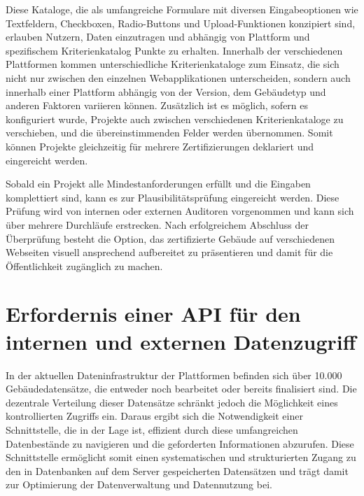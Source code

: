\documentclass[draft,final]{vutinfth} %
\begin{document}
Diese Kataloge, die als umfangreiche Formulare mit diversen Eingabeoptionen wie Textfeldern, Checkboxen, Radio-Buttons und Upload-Funktionen konzipiert sind, erlauben Nutzern, Daten einzutragen und abhängig von Plattform und spezifischem Kriterienkatalog Punkte zu erhalten.
Innerhalb der verschiedenen Plattformen kommen unterschiedliche Kriterienkataloge zum Einsatz, die sich nicht nur zwischen den einzelnen Webapplikationen unterscheiden, sondern auch innerhalb einer Plattform abhängig von der Version, dem Gebäudetyp und anderen Faktoren variieren können. 
Zusätzlich ist es möglich, sofern es konfiguriert wurde, Projekte auch zwischen verschiedenen Kriterienkataloge zu verschieben, und die übereinstimmenden Felder werden übernommen. 
Somit können Projekte gleichzeitig für mehrere Zertifizierungen deklariert und eingereicht werden.

Sobald ein Projekt alle Mindestanforderungen erfüllt und die Eingaben komplettiert sind, kann es zur Plausibilitätsprüfung eingereicht werden. 
Diese Prüfung wird von internen oder externen Auditoren vorgenommen und kann sich über mehrere Durchläufe erstrecken. 
Nach erfolgreichem Abschluss der Überprüfung besteht die Option, das zertifizierte Gebäude auf verschiedenen Webseiten visuell ansprechend aufbereitet zu präsentieren und damit für die Öffentlichkeit zugänglich zu machen.


\section{Erfordernis einer API für den internen und externen Datenzugriff}

In der aktuellen Dateninfrastruktur der Plattformen befinden sich über 10.000 Gebäudedatensätze, die entweder noch bearbeitet oder bereits finalisiert sind. 
Die dezentrale Verteilung dieser Datensätze schränkt jedoch die Möglichkeit eines kontrollierten Zugriffs ein. 
Daraus ergibt sich die Notwendigkeit einer Schnittstelle, die in der Lage ist, effizient durch diese umfangreichen Datenbestände zu navigieren und die geforderten Informationen abzurufen. 
Diese Schnittstelle ermöglicht somit einen systematischen und strukturierten Zugang zu den in Datenbanken auf dem Server gespeicherten Datensätzen und trägt damit zur Optimierung der Datenverwaltung und Datennutzung bei.
\end{document}

